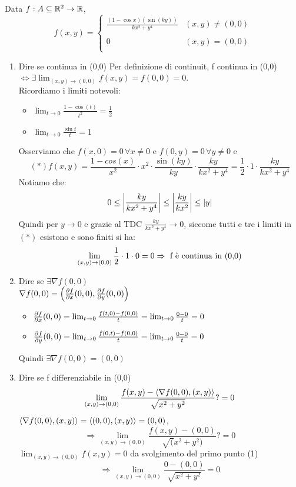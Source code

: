 \begin{eexercise}[Es 1, Provetta]
  Data $f: A \subseteq \mathbb{R}^2 \to \mathbb{R}$, $$f(x,y) = \left\{\begin{array}{ll}
    \frac{(1-\cos{x})(\sin(ky))}{kx^2 + y^4} & (x,y)\neq (0,0) \\
    \\
    0 & (x,y) = (0,0) \\
  \end{array}\right.$$
  \begin{enumerate}
    \item Dire se \ace continua in (0,0)
       Per definizione di continuit\aca, f \ace continua in (0,0) \\ $\iff \exists 
        \lim_{(x,y)\to (0,0)} f(x,y) = f(0,0) = 0$.\\
        Ricordiamo i limiti notevoli:
        \begin{itemize}
          \item $\lim_{t \to 0}\frac{1-\cos(t)}{t^2} = \frac{1}{2}$
          \item $\lim_{t \to 0} \frac{\sin{t}}{t} = 1$
        \end{itemize}
        Osserviamo che $f(x,0) = 0 \, \forall x \not = 0$ e $f(0,y) = 0 \, \forall y \not = 0$ e
        $$(*) f(x,y) = \frac{1-cos(x)}{x^2} \cdot x^2 \cdot \frac{\sin(ky)}{ky} \cdot \frac{ky}{kx^2 + y^4} = 
          \frac{1}{2} \cdot 1 \cdot \frac{ky}{kx^2 + y^4}$$ 
        Notiamo che:
        $$0 \leq \left\lvert \frac{ky}{kx^2 + y^4} \right\rvert \leq \left\lvert \frac{ky}{kx^2} \right\rvert\leq \left\lvert y \right\rvert$$
        Quindi per $y \to 0$ e grazie al TDC $\frac{ky}{kx^2 + y^4} \to 0$, 
        siccome tutti e tre i limiti in $(*)$ esistono e sono finiti si ha:
        $$\lim_{(x,y) \to (0,0)} \frac{1}{2} \cdot 1 \cdot 0 = 0 \Rightarrow \text{ f \`e continua in (0,0)}$$
    \item Dire se $\exists \nabla f(0,0)$\\
          $\nabla f(0,0) = \left(\frac{\partial f}{\partial x}(0,0), \frac{\partial f}{\partial y}(0,0)\right)$
          \begin{itemize}
            \item $\frac{\partial f}{\partial x}(0,0) = \lim_{t \to 0} \frac{f(t,0) - f(0,0)}{t} = \lim_{t \to 0} \frac{0-0}{t} = 0$
            \item $\frac{\partial f}{\partial y}(0,0) = \lim_{t \to 0} \frac{f(0,t) - f(0,0)}{t} = \lim_{t \to 0} \frac{0-0}{t} = 0$
          \end{itemize}
          Quindi $\exists \nabla f(0,0) = (0,0)$
    \item Dire se f \ace differenziabile in (0,0)
          $$\lim_{(x,y)\to (0,0)} \frac{f(x,y)-\left\langle \nabla f(0,0), (x,y) \right\rangle}{\sqrt{x^2+y^2}} ?= 0$$
          $\left\langle \nabla f(0,0), (x,y) \right\rangle = \left\langle (0,0),(x,y) \right\rangle = (0,0)$, \\
          $$\Rightarrow \lim_{(x,y)\to (0,0)}\frac{f(x,y)-(0,0)}{\sqrt(x^2+y^2)} ?= 0$$
          $\lim_{(x,y)\to (0,0) } f(x,y) = 0$ da svolgimento del primo punto (1) 
          $$\Rightarrow \lim_{(x,y)\to (0,0)} \frac{0 - (0,0)}{\sqrt{x^2+y^2}} = 0$$
  \end{enumerate}
\end{eexercise}

















